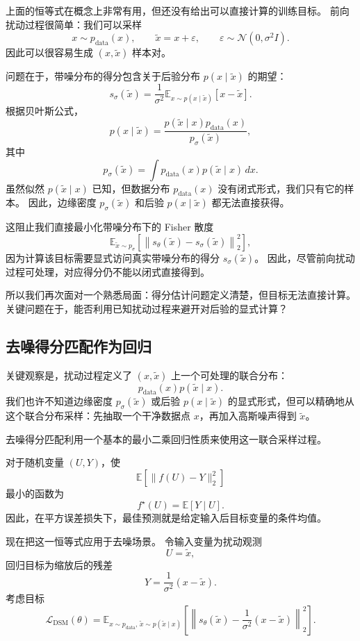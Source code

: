 上面的恒等式在概念上非常有用，但还没有给出可以直接计算的训练目标。
前向扰动过程很简单：我们可以采样
\[
x\sim p_{\text{data}}(x),
\qquad
\tilde{x}=x+\varepsilon,
\qquad
\varepsilon\sim\mathcal{N}(0,\sigma^2 I).
\]
因此可以很容易生成 $(x,\tilde{x})$ 样本对。

问题在于，带噪分布的得分包含关于后验分布 $p(x\mid\tilde{x})$ 的期望：
\[
s_\sigma(\tilde{x})
=
\frac{1}{\sigma^2}
\mathbb{E}_{x\sim p(x\mid\tilde{x})}
\left[
x-\tilde{x}
\right].
\]
根据贝叶斯公式，
\[
p(x\mid\tilde{x})
=
\frac{
p(\tilde{x}\mid x)p_{\text{data}}(x)
}{
p_\sigma(\tilde{x})
},
\]
其中
\[
p_\sigma(\tilde{x})
=
\int
p_{\text{data}}(x)p(\tilde{x}\mid x)\,dx.
\]
虽然似然 $p(\tilde{x}\mid x)$ 已知，但数据分布 $p_{\text{data}}(x)$ 没有闭式形式，我们只有它的样本。
因此，边缘密度 $p_\sigma(\tilde{x})$ 和后验 $p(x\mid\tilde{x})$ 都无法直接获得。

这阻止我们直接最小化带噪分布下的 Fisher 散度
\[
\mathbb{E}_{\tilde{x}\sim p_\sigma}
\left[
\left\|
s_\theta(\tilde{x})
-
s_\sigma(\tilde{x})
\right\|_2^2
\right],
\]
因为计算该目标需要显式访问真实带噪分布的得分 $s_\sigma(\tilde{x})$。
因此，尽管前向扰动过程可处理，对应得分仍不能以闭式直接得到。

所以我们再次面对一个熟悉局面：得分估计问题定义清楚，但目标无法直接计算。
关键问题在于，能否利用已知扰动过程来避开对后验的显式计算？

\subsection{去噪得分匹配作为回归}

关键观察是，扰动过程定义了 $(x,\tilde{x})$ 上一个可处理的联合分布：
\[
p_{\text{data}}(x)p(\tilde{x}\mid x).
\]
我们也许不知道边缘密度 $p_\sigma(\tilde{x})$ 或后验 $p(x\mid\tilde{x})$ 的显式形式，但可以精确地从这个联合分布采样：先抽取一个干净数据点 $x$，再加入高斯噪声得到 $\tilde{x}$。

去噪得分匹配利用一个基本的最小二乘回归性质来使用这一联合采样过程。

\begin{tcolorbox}[
  colback=blue!4,
  colframe=blue!50!black,
  title={最小二乘回归恒等式},
  boxrule=0.6pt,
  arc=2mm,
  left=2mm,
  right=2mm,
  top=1mm,
  bottom=1mm
]
对于随机变量 $(U,Y)$，使
\[
\mathbb{E}
\left[
\|f(U)-Y\|_2^2
\right]
\]
最小的函数为
\[
f^\star(U)=\mathbb{E}[Y\mid U].
\]
因此，在平方误差损失下，最佳预测就是给定输入后目标变量的条件均值。
\end{tcolorbox}

现在把这一恒等式应用于去噪场景。
令输入变量为扰动观测
\[
U=\tilde{x},
\]
回归目标为缩放后的残差
\[
Y=
\frac{1}{\sigma^2}(x-\tilde{x}).
\]
考虑目标
\[
\boxed{
\mathcal{L}_{\text{DSM}}(\theta)
=
\mathbb{E}_{x\sim p_{\text{data}},\,
\tilde{x}\sim p(\tilde{x}\mid x)}
\left[
\left\|
s_\theta(\tilde{x})
-
\frac{1}{\sigma^2}(x-\tilde{x})
\right\|_2^2
\right].
}
\]


